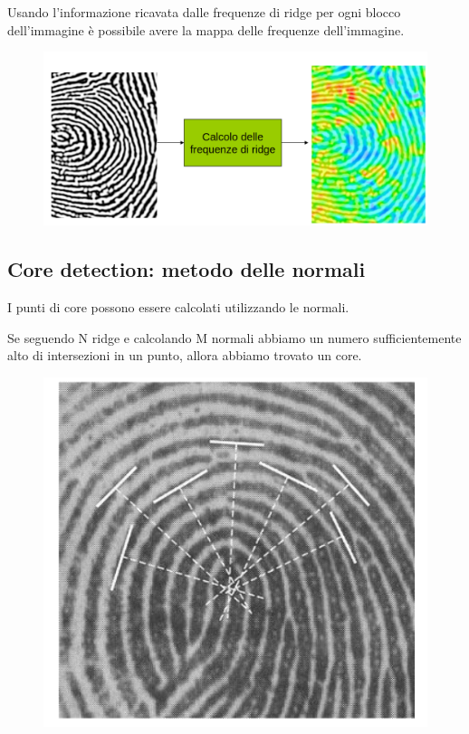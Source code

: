 Usando l’informazione ricavata dalle frequenze di
ridge per ogni blocco dell’immagine è possibile
avere la mappa delle frequenze dell’immagine.

\begin{figure}[ht]
    \centering
    \includegraphics[width=1\linewidth]{chapters/images-chap6/spazio-freq.png}
\end{figure}

\subsection{Core detection: metodo delle normali}

I punti di core possono essere calcolati utilizzando le normali.

Se seguendo N ridge e calcolando M normali abbiamo un numero sufficientemente
alto di intersezioni in un punto, allora abbiamo trovato un core.

\begin{figure}
    \centering
    \includegraphics[width=0.75\linewidth]{chapters/images-chap6/core-detection.png}
\end{figure}

